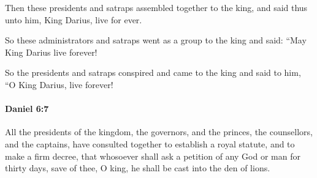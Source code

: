 			\begin{versebox}
					\item[BHS] 
					\item[LXX] 
					\item[ASV] Then these presidents and satraps assembled together to the king, and said thus unto him, King Darius, live for ever.
					\item[NIV] So these administrators and satraps went as a group to the king and said: “May King Darius live forever!
					\item[NRSV] So the presidents and satraps conspired and came to the king and said to him, “O King Darius, live forever!
			\end{versebox}

		\paragraph{Daniel 6:7} %
			\label{DANIEL-6-7}

			All the presidents of the kingdom, the governors, and the princes, the counsellors, and the captains, have consulted together to establish a royal statute, and to make a firm decree, that whosoever shall ask a petition of any God or man for thirty days, save of thee, O king, he shall be cast into the den of lions.

